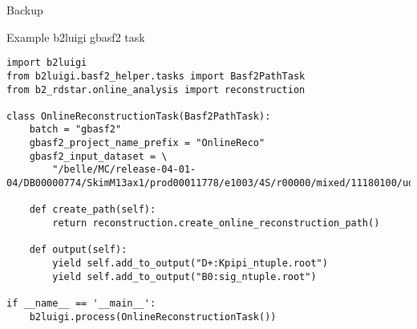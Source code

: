 \documentclass[aspectratio=169, 16pt]{beamer}
\begin{document}
\begin{frame}[label={sec:org21db1cc}]{Backup}
\appendix
\end{frame}
\begin{frame}[label={sec:org8444811},fragile]{Example b2luigi gbasf2 task}
 \lstset{language=Python,label= ,caption= ,captionpos=b,numbers=none,basicstyle=\scriptsize\ttfamily, xleftmargin=-5pt}
\begin{lstlisting}
import b2luigi
from b2luigi.basf2_helper.tasks import Basf2PathTask
from b2_rdstar.online_analysis import reconstruction

class OnlineReconstructionTask(Basf2PathTask):
    batch = "gbasf2"
    gbasf2_project_name_prefix = "OnlineReco"
    gbasf2_input_dataset = \
        "/belle/MC/release-04-01-04/DB00000774/SkimM13ax1/prod00011778/e1003/4S/r00000/mixed/11180100/udst/sub00"

    def create_path(self):
        return reconstruction.create_online_reconstruction_path()

    def output(self):
        yield self.add_to_output("D+:Kpipi_ntuple.root")
        yield self.add_to_output("B0:sig_ntuple.root")

if __name__ == '__main__':
    b2luigi.process(OnlineReconstructionTask())
\end{lstlisting}
\end{frame}
\end{document}

